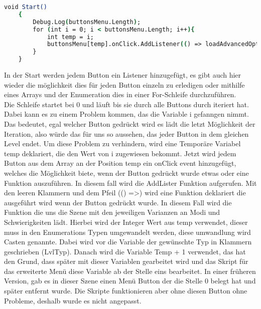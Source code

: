 \begin{lstlisting}[language=csh, caption={MenuPickLevel.cs Klasse Menü start Funktion}]
	void Start()
	{
		Debug.Log(buttonsMenu.Length);
		for (int i = 0; i < buttonsMenu.Length; i++){
			int temp = i;
			buttonsMenu[temp].onClick.AddListener(() => loadAdvancedOptions((LvlType)temp + 1));
		}
	}
\end{lstlisting}
In der Start werden jedem Button ein Listener hinzugefügt, es gibt auch hier wieder die möglichkeit dies für jeden Button einzeln zu erledigen oder mithilfe eines Arrays und der Enumeration dies in einer For-Schleife durchzuführen.\\
Die Schleife startet bei 0 und läuft bis sie durch alle Buttons durch iteriert hat. Dabei kann es zu einem Problem kommen, das die Variable i gefanngen nimmt. Das bedeutet, egal welcher Button gedrückt wird es lädt die letzt Möglichkeit der Iteration, also würde das für uns so aussehen, das jeder Button in dem gleichen Level endet. Um diese Problem zu verhindern, wird eine Temporäre Variabel temp deklariert, die den Wert von i zugewiesen bekommt. Jetzt wird jedem Button aus dem Array an der Position temp ein onClick event hinzugefügt, welches die Möglichkeit biete, wenn der Button gedrückt wurde etwas oder eine Funktion auszuführen. In diesem fall wird die AddLister Funktion aufgerufen. Mit den leeren Klammern und dem Pfeil (() =>) wird eine Funktion deklariert die ausgeführt wird wenn der Button gedrückt wurde. In diesem Fall wird die Funktion die uns die Szene mit den jeweiligen Varianzen an Modi und Schwierigkeiten lädt. Hierbei wird der Integer Wert aus temp verwendet, dieser muss in den Enumerations Typen umgewandelt werden, diese umwandlung wird Casten genannte. Dabei wird vor die Variable der gewünschte Typ in Klammern geschrieben (LvlTyp). Danach wird die Variable Temp + 1 verwendet, das hat den Grund, dass später mit dieser Variablen gearbeitet wird und das Skript für das erweiterte Menü diese Variable ab der Stelle eins bearbeitet. In einer früheren Version, gab es in dieser Szene einen Menü Button der die Stelle 0 belegt hat und später entfernt wurde. Die Skripte funktionieren aber ohne diesen Button ohne Probleme, deshalb wurde es nicht angepasst.\\

